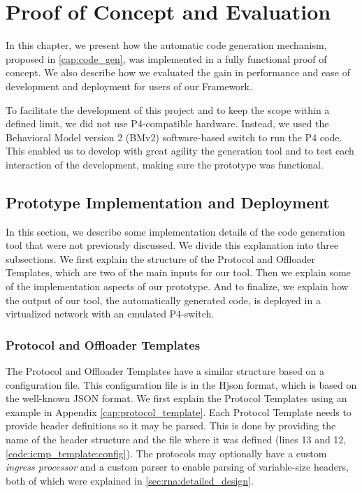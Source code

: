 \chapter{Proof of Concept and Evaluation}
\label{cap:evaluation}

In this chapter, we present how the automatic code generation mechanism, proposed in \autoref{cap:code_gen}, was implemented in a fully functional proof of concept. We also describe how we evaluated the gain in performance and ease of development and deployment for users of our Framework.

To facilitate the development of this project and to keep the scope within a defined limit, we did not use P4-compatible hardware. Instead, we used the Behavioral Model version 2 (BMv2) software-based switch \cite{BMv2} to run the P4 code. This enabled us to develop with great agility the generation tool and to test each interaction of the development, making sure the prototype was functional.


\section{Prototype Implementation and Deployment}
\label{sec:evaluation:implementation}

In this section, we describe some implementation details of the code generation tool that were not previously discussed. We divide this explanation into three subsections. We first explain the structure of the Protocol and Offloader Templates, which are two of the main inputs for our tool. Then we explain some of the implementation aspects of our prototype. And to finalize, we explain how the output of our tool, the automatically generated code, is deployed in a virtualized network with an emulated P4-switch.


\subsection{Protocol and Offloader Templates}

The Protocol and Offloader Templates have a similar structure based on a configuration file. This configuration file is in the Hjson \cite{Hjson} format, which is based on the well-known JSON format. We first explain the Protocol Templates using an example in Appendix \ref{cap:protocol_template}. Each Protocol Template needs to provide header definitions so it may be parsed. This is done by providing the name of the header structure and the file where it was defined (lines 13 and 12, \autoref{code:icmp_template:config}). The protocols may optionally have a custom \textit{ingress processor} and a custom parser to enable parsing of variable-size headers, both of which were explained in \autoref{sec:rna:detailed_design}.

